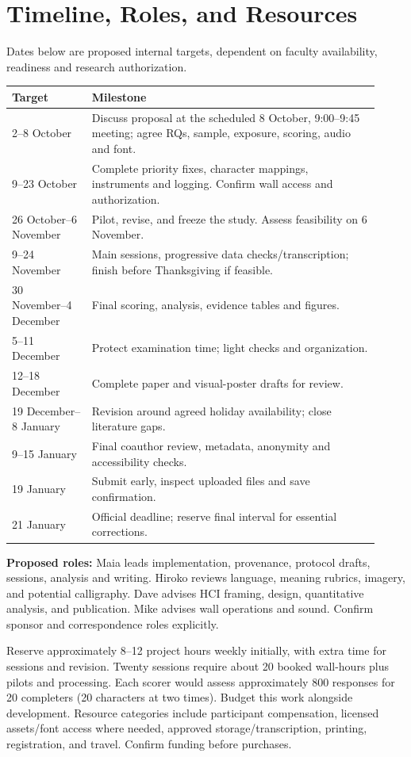 \documentclass[11pt,letterpaper]{article}
\begin{document}
\section{Timeline, Roles, and Resources}
Dates below are proposed internal targets, dependent on faculty availability, readiness and research authorization.
\begin{longtable}{p{0.20\linewidth}p{0.72\linewidth}}
\toprule Target & Milestone \\
\midrule\endhead
2--8 October & Discuss proposal at the scheduled 8 October, 9:00--9:45 meeting; agree RQs, sample, exposure, scoring, audio and font. \\
9--23 October & Complete priority fixes, character mappings, instruments and logging. Confirm wall access and authorization. \\
26 October--6 November & Pilot, revise, and freeze the study. Assess feasibility on 6 November. \\
9--24 November & Main sessions, progressive data checks/transcription; finish before Thanksgiving if feasible. \\
30 November--4 December & Final scoring, analysis, evidence tables and figures. \\
5--11 December & Protect examination time; light checks and organization. \\
12--18 December & Complete paper and visual-poster drafts for review. \\
19 December--8 January & Revision around agreed holiday availability; close literature gaps. \\
9--15 January & Final coauthor review, metadata, anonymity and accessibility checks. \\
19 January & Submit early, inspect uploaded files and save confirmation. \\
21 January & Official deadline; reserve final interval for essential corrections. \\
\bottomrule
\end{longtable}

\textbf{Proposed roles:} Maia leads implementation, provenance, protocol drafts, sessions, analysis and writing. Hiroko reviews language, meaning rubrics, imagery, and potential calligraphy. Dave advises HCI framing, design, quantitative analysis, and publication. Mike advises wall operations and sound. Confirm sponsor and correspondence roles explicitly.

Reserve approximately 8--12 project hours weekly initially, with extra time for sessions and revision. Twenty sessions require about 20 booked wall-hours plus pilots and processing. Each scorer would assess approximately 800 responses for 20 completers (20 characters at two times). Budget this work alongside development. Resource categories include participant compensation, licensed assets/font access where needed, approved storage/transcription, printing, registration, and travel. Confirm funding before purchases.
\end{document}
